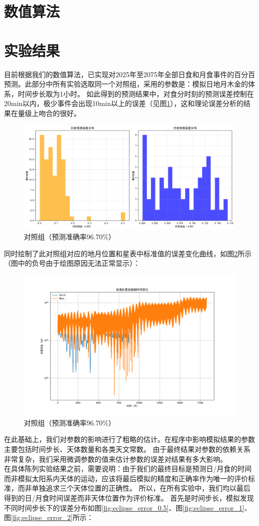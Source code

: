 \documentclass[hidelinks]{article}
\begin{document}
\section{数值算法}

\section{实验结果}
目前根据我们的数值算法，已实现对2025年至2075年全部日食和月食事件的百分百预测。此部分中所有实验选取同一个对照组，采用的参数是：模拟日地月木金的体系，时间步长取为1小时。
如此得到的预测结果中，对食分时刻的预测误差控制在20min以内，极少事件会出现10min以上的误差（见图\ref{fig:eclipse_error}），这和理论误差分析的结果在量级上吻合的很好。

\begin{figure}[h]
    \centering
    \includegraphics[width=0.5\linewidth]{images/error_distribution_1.png}
    \caption{对照组（预测准确率96.70\%）}
    \label{fig:eclipse_error}
\end{figure}

同时绘制了此对照组对应的地月位置和星表中标准值的误差变化曲线，如图\ref{fig:position_error}所示（图中的负号由于绘图原因无法正常显示）：

\begin{figure}[h]
    \centering
    \includegraphics[width=0.5\linewidth]{images/position_errors.png}
    \caption{对照组（预测准确率96.70\%）}
    \label{fig:position_error}
\end{figure}

在此基础上，我们对参数的影响进行了粗略的估计。在程序中影响模拟结果的参数主要包括时间步长、天体数量和各类天文常数。
由于最终结果对参数的依赖关系非常复杂，我们采用微调参数的值来估计参数的误差对结果有多大影响。\\
在具体陈列实验结果之前，需要说明：由于我们的最终目标是预测日/月食的时间而非模拟太阳系内天体的运动，应该将最后模拟的精度和正确率作为唯一的评价标准，而非单独追求三个天体位置的正确性。
所以，在所有实验中，我们均以最后得到的日/月食时间误差而非天体位置作为评价标准。
首先是时间步长，模拟发现不同时间步长下的误差分布如图\ref{fig:eclipse_error_0.5}、图\ref{fig:eclipse_error_1}、图\ref{fig:eclipse_error_2}所示：
\end{document}
